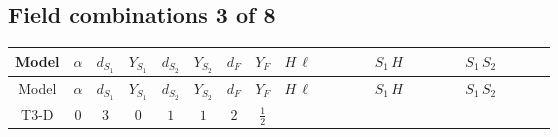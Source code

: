 \documentclass[8pt]{article}
\begin{document}
\begin{landscape}
\subsection*{Field combinations 3 of 8}
\begin{longtable}{@{}cccccccc >{\raggedright\arraybackslash}p{0.21\linewidth} >{\raggedright\arraybackslash}p{0.21\linewidth} >{\raggedright\arraybackslash}p{0.21\linewidth}@{}}
\toprule
Model & $\alpha$ & $d_{S_1}$ & $Y_{S_1}$ & $d_{S_2}$ & $Y_{S_2}$ & $d_F$ & $Y_F$ & $H\,\ell$ & $S_1\,H$ & $S_1\,S_2$ \\
\midrule
\endfirsthead
\toprule
Model & $\alpha$ & $d_{S_1}$ & $Y_{S_1}$ & $d_{S_2}$ & $Y_{S_2}$ & $d_F$ & $Y_F$ & $H\,\ell$ & $S_1\,H$ & $S_1\,S_2$ \\
\midrule
\endhead
T3-D & $0$ & $3$ & $0$ & $1$ & $1$ & $2$ & $\frac{1}{2}$ & \scriptsize\adjustbox{max width=\linewidth}{$\begin{gathered} +\frac{2 \hbar  \overline{y_{1,i_1,r_1}} \overline{y_{2,i_2,r_1}} L_{a_4,i_2}{}^T\, C\, P_L\, L_{a_2,i_1} H_{a_1} H_{a_3} \lambda_5 \epsilon_{a_1,a_2} \epsilon_{a_3,a_4}}{\sqrt{3} \epsilon  M_F} \\ +\frac{2 \hbar  \overline{y_{1,i_1,r_1}} \overline{y_{2,i_2,r_1}} L_{a_4,i_2}{}^T\, C\, P_L\, L_{a_2,i_1} H_{a_1} H_{a_3} \lambda_5 \epsilon_{a_1,a_2} \epsilon_{a_3,a_4}}{\sqrt{3} M_F} \\ +\frac{2 \hbar  \overline{\lambda_5} \overline{L_{a_3,i_1}}\, C\, P_R\, \overline{L_{a_4,i_2}}{}^T y_{1,i_1,r_1} y_{2,i_2,r_1} \epsilon_{a_1,a_3} \epsilon_{a_2,a_4} H_{a_1}{}^{\dagger } H_{a_2}{}^{\dagger }}{\sqrt{3} \epsilon  M_F}\end{gathered}$} & \scriptsize\adjustbox{max width=\linewidth}{$\begin{gathered} -\frac{2 \hbar  \overline{y_{1,i_1,r_1}} \overline{Y_{e,i_2,i_3}} H_{a_1} S_{1,j_1} y_{1,i_2,r_1} Y_{e,i_1,i_3} H_{a_1}{}^{\dagger } S_{1,j_1}{}^{\dagger }}{\sqrt{3} \epsilon } \\ -\frac{2 \hbar  \overline{y_{1,i_1,r_1}} \overline{Y_{e,i_2,i_3}} H_{a_1} S_{1,j_1} y_{1,i_2,r_1} Y_{e,i_1,i_3} H_{a_1}{}^{\dagger } S_{1,j_1}{}^{\dagger }}{\sqrt{3}} \\ +\frac{2 i \sqrt{\frac{2}{3}} \hbar  \overline{y_{1,i_1,r_1}} \overline{Y_{e,i_2,i_3}} H_{a_2} S_{1,j_2} y_{1,i_2,r_1} Y_{e,i_1,i_3} H_{a_1}{}^{\dagger } S_{1,j_1}{}^{\dagger } \mathcal{I}_{H1,a_1,a_2,j_1,j_2}{}^1}{\epsilon }\end{gathered}$} & \scriptsize\adjustbox{max width=\linewidth}{$\begin{gathered} -\frac{4 \hbar  \overline{y_{1,i_1,r_1}} \overline{y_{2,i_2,r_2}} S_2 S_{1,j_1} y_{1,i_2,r_1} y_{2,i_1,r_2} S_2{}^{\dagger } S_{1,j_1}{}^{\dagger }}{\sqrt{3} \epsilon } \\ +\frac{4 \hbar  \overline{y_{1,i_1,r_1}} \overline{y_{2,i_2,r_1}} S_2 S_{1,j_1} y_{1,i_2,r_2} y_{2,i_1,r_2} S_2{}^{\dagger } S_{1,j_1}{}^{\dagger }}{\sqrt{3}} \\ +\frac{4 \hbar  \overline{y_{1,i_1,r_1}} \overline{y_{2,i_2,r_1}} S_2 S_{1,j_1} y_{1,i_1,r_2} y_{2,i_2,r_2} S_2{}^{\dagger } S_{1,j_1}{}^{\dagger }}{\sqrt{3}}\end{gathered}$} \\

\end{longtable}
\end{landscape}
\end{document}
